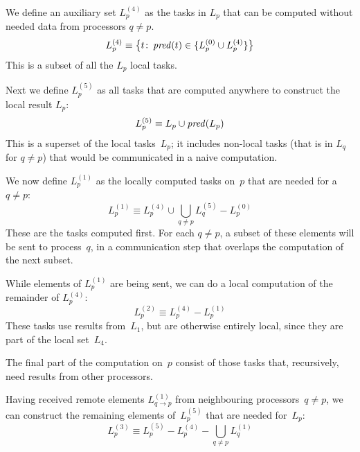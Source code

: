 
We define an auxiliary set
$L^{(4)}_{p}$
as the tasks in
$L_{p}$
that can be computed without
needed data from processors $q\not=p$. 
\[
L^{(4)}_{p} \equiv
\bigl\{ t\colon \mathop{\mathit{pred}}(t)\in \{ L^{(0)}_{p} \cup L^{(4)}_{p} \} 
\bigr\}
\]
This is a subset of all the $L_p$ local tasks.

  
Next we define
$L^{(5)}_{p}$
as all tasks
that are computed anywhere to construct the local result
$L_{p}$:
\[
L^{(5)}_{p} \equiv
L_{p} \cup \mathop{\mathit{pred}}(L_{p})
\]
This is a superset of the local tasks~$L_p$; it includes non-local
tasks (that is in $L_q$ for $q\not=p$) that would be communicated in a
naive computation.


We now define
$L^{(1)}_{p}$
as the locally
computed tasks on~$p$ that are needed for a $q\not=p$:
\[
L^{(1)}_{p}\equiv
L^{(4)}_{p} \cup \bigcup_{q\not=p} L^{(5)}_{q}
- L^{(0)}_{p}
\]
These are the tasks computed first. For each $q\not=p$, a subset of
these elements will be sent to process~$q$, in a communication step
that overlaps the computation of the next subset.


While elements of
$L^{(1)}_{p}$
are being sent, we can do a local
computation of the remainder of
$L^{(4)}_{p}$:
\[
L^{(2)}_{p} \equiv L^{(4)}_{p} - L^{(1)}_{p}
\]
These tasks use results from~$L_1$, but are otherwise entirely local,
since they are part of the local set~$L_4$.


The final part of the computation on~$p$ consist of those tasks that,
recursively, need results from other processors.

Having received remote elements
$L^{(1)}_{q\rightarrow p}$
from neighbouring
processors~$q\not=p$, we can construct the remaining elements
%
of~$L^{(5)}_{p}$ that are needed for~$L_{p}$:
\[
L^{(3)}_{p} \equiv
L^{(5)}_{p} - L^{(4)}_{p} - \bigcup_{q\not=p} L^{(1)}_{q}
\]


